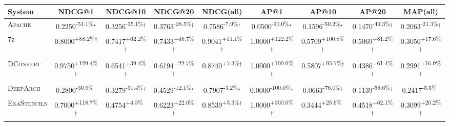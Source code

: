 \begin{table}[htbp]
\centering
\renewcommand{\arraystretch}{1.2}
\begin{tabular}{l|cccc|cccc}
\hline
System & NDCG@1 & NDCG@10 & NDCG@20 & NDCG(all) & AP@1 & AP@10 & AP@20 & MAP(all) \\ \hline
\textsc{Apache} & \cellcolor{red!30}0.2250\textsuperscript{-51.1\%}$^\star$ & \cellcolor{red!30}0.3256\textsuperscript{-35.1\%}$^\dagger$ & \cellcolor{red!30}0.3763\textsuperscript{-28.5\%}$^\dagger$ & \cellcolor{red!30}0.7586\textsuperscript{-7.9\%}$^\dagger$ & \cellcolor{red!30}0.0500\textsuperscript{-90.0\%}$^\star$ & \cellcolor{red!30}0.1596\textsuperscript{-50.2\%}$^\star$ & \cellcolor{red!30}0.1470\textsuperscript{-49.3\%}$^\dagger$ & \cellcolor{red!30}0.2063\textsuperscript{-21.3\%}$^\dagger$ \\
\textsc{7z} & \cellcolor{green!30}0.8000\textsuperscript{+88.2\%}$^\dagger$ & \cellcolor{green!30}0.7417\textsuperscript{+62.2\%}$^\dagger$ & \cellcolor{green!30}0.7433\textsuperscript{+48.7\%}$^\dagger$ & \cellcolor{green!30}0.9041\textsuperscript{+11.1\%}$^\dagger$ & \cellcolor{green!30}1.0000\textsuperscript{+122.2\%}$^\dagger$ & \cellcolor{green!30}0.5709\textsuperscript{+100.8\%}$^\dagger$ & \cellcolor{green!30}0.5069\textsuperscript{+81.2\%}$^\dagger$ & \cellcolor{green!30}0.3056\textsuperscript{+17.6\%}$^\dagger$ \\
\textsc{DConvert} & \cellcolor{green!30}0.9750\textsuperscript{+129.4\%}$^\dagger$ & \cellcolor{green!30}0.6541\textsuperscript{+39.4\%}$^\dagger$ & \cellcolor{green!30}0.6194\textsuperscript{+22.7\%}$^\dagger$ & \cellcolor{green!30}0.8740\textsuperscript{+7.3\%}$^\dagger$ & \cellcolor{green!30}1.0000\textsuperscript{+100.0\%}$^\dagger$ & \cellcolor{green!30}0.5807\textsuperscript{+95.7\%}$^\dagger$ & \cellcolor{green!30}0.4386\textsuperscript{+61.4\%}$^\dagger$ & \cellcolor{green!30}0.2991\textsuperscript{+16.9\%}$^\dagger$ \\
\textsc{DeepArch} & \cellcolor{red!30}0.2800\textsuperscript{-30.9\%}$^{\,\,\,}$ & \cellcolor{red!30}0.3279\textsuperscript{-31.4\%}$^\dagger$ & \cellcolor{red!30}0.4529\textsuperscript{-12.1\%}$^\star$ & \cellcolor{red!30}0.7907\textsuperscript{-3.2\%}$^\star$ & \cellcolor{red!30}0.0000\textsuperscript{-100.0\%}$^\star$ & \cellcolor{red!30}0.0663\textsuperscript{-76.0\%}$^\dagger$ & \cellcolor{red!30}0.1139\textsuperscript{-56.6\%}$^\dagger$ & \cellcolor{red!30}0.2417\textsuperscript{-5.5\%}$^{\,\,\,}$ \\
\textsc{ExaStencils} & \cellcolor{green!30}0.7000\textsuperscript{+118.7\%}$^\dagger$ & \cellcolor{green!30}0.4754\textsuperscript{+4.3\%}$^{\,\,\,}$ & \cellcolor{green!30}0.6223\textsuperscript{+22.6\%}$^\dagger$ & \cellcolor{green!30}0.8539\textsuperscript{+5.3\%}$^\dagger$ & \cellcolor{green!30}1.0000\textsuperscript{+300.0\%}$^\dagger$ & \cellcolor{green!30}0.3444\textsuperscript{+25.6\%}$^{\,\,\,}$ & \cellcolor{green!30}0.4518\textsuperscript{+62.1\%}$^\dagger$ & \cellcolor{green!30}0.3099\textsuperscript{+20.2\%}$^\dagger$ \\

\end{tabular}
\end{table}
